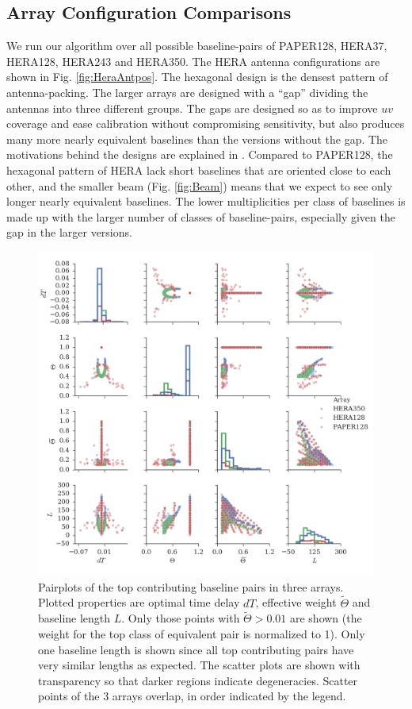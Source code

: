 \documentclass[twocolumn,apj,numberedappendix]{emulateapj}
\renewcommand\[{\begin{equation}}
\renewcommand\]{\end{equation}}
\begin{document}
\subsection{Array Configuration Comparisons \label{sec:arrconf}}
We run our algorithm over all possible baseline-pairs of  PAPER128, HERA37, HERA128, HERA243 and HERA350. The HERA antenna configurations are shown in Fig. \ref{fig:HeraAntpos}. The  
hexagonal design is the densest pattern of antenna-packing. The larger arrays are designed with a ``gap'' dividing the antennas into three different groups. The gaps are designed so as to improve $uv$ coverage and ease calibration without compromising sensitivity, but also produces many more nearly equivalent baselines than the versions without the gap. The motivations behind the designs are explained in \cite{HERAconfiguration}.  Compared to PAPER128, the hexagonal pattern of HERA lack short baselines that are oriented close to each other, and the smaller beam (Fig. \ref{fig:Beam}) means that we expect to see only longer nearly equivalent baselines. The lower multiplicities per class of baselines is made up with the larger number of classes of baseline-pairs, especially given the gap in the larger versions. 

\begin{figure}[H]
\includegraphics[width=\linewidth]{pairplot}

\caption{Pairplots of the top contributing baseline pairs in three arrays. Plotted properties are optimal time delay $dT$,  effective weight $\widetilde{\Theta}$ and baseline length $L$. Only those points with $\widetilde{\Theta}>0.01$ are shown (the weight for the top class of equivalent pair is normalized to 1). Only one baseline length is shown since all top contributing pairs have very similar lengths as expected. The scatter plots are shown with transparency so that darker regions indicate degeneracies. Scatter points of the 3 arrays overlap, in order indicated by the legend. }
\label{fig:pairplot}
\end{figure}
\end{document}
